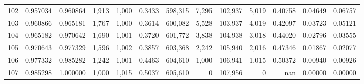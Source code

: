 \begin{tabular}{rrrrrrrrrrrrr}
102 &  0.957034 &  0.960864 &   1,913 &  1,000 &                                     0.3433 &  598,315 &    7,295 &  102,937 &    5,019 &  0.40758 &  0.04649 &  0.06757 \\
103 &  0.960866 &  0.965181 &   1,767 &  1,000 &                                     0.3614 &  600,082 &    5,528 &  103,937 &    4,019 &  0.42097 &  0.03723 &  0.05121 \\
104 &  0.965182 &  0.970642 &   1,690 &  1,001 &                                     0.3720 &  601,772 &    3,838 &  104,938 &    3,018 &  0.44020 &  0.02796 &  0.03555 \\
105 &  0.970643 &  0.977329 &   1,596 &  1,002 &                                     0.3857 &  603,368 &    2,242 &  105,940 &    2,016 &  0.47346 &  0.01867 &  0.02077 \\
106 &  0.977332 &  0.985282 &   1,242 &  1,001 &                                     0.4463 &  604,610 &    1,000 &  106,941 &    1,015 &  0.50372 &  0.00940 &  0.00926 \\
107 &  0.985298 &  1.000000 &   1,000 &  1,015 &                                     0.5037 &  605,610 &        0 &  107,956 &        0 &      nan &  0.00000 &  0.00000 \\
\bottomrule
\end{tabular}
